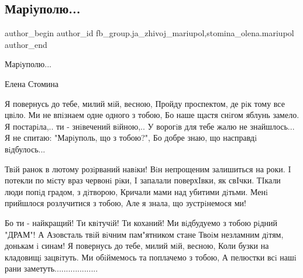  
 
 
 
 

\subsection{Марiуполю...}
\label{sec:26_02_2023.fb.fb_group.ja_zhivoj_mariupol.1.mariupolyu_}
 
\ifcmt
 author_begin
   author_id fb_group.ja_zhivoj_mariupol,stomina_olena.mariupol
 author_end
\fi

Марiуполю...

Елена Стомина

\obeycr
Я повернусь до тебе, милий мiй, весною,
Пройду проспектом, де рiк тому все цвiло.
Ми не впiзнаем одне одного з тобою,
Бо наше щастя снiгом яблунь замело.
Я постарiла,.. ти - знiвечений вiйною,..
У ворогiв для тебе жалю не знайшлось...
Я не спитаю: "Марiуполь, що з тобою?",
Бо добре знаю, що насправдi вiдбулось...
\restorecr

\obeycr
Твiй ранок в лютому розiрваний навiки!
Вiн непрощеним залишиться на роки.
I потекли по мiсту враз червонi рiки,
I запалали поверхIвки, як свIчки.
ТIкали люди попiд градом, з дiтворою,
Кричали мами над убитими дiтьми.
Менi прийшлося розлучитися з тобою,
Але я знала, що зустрiнемося ми!
\restorecr

\obeycr
Бо ти - найкращий! Ти квiтучiй! Ти коханий!
Ми вiдбудуемо з тобою рiдний "ДРАМ"!
А Азовсталь твiй вiчним пам"ятником стане
Твоiм незламним дiтям, донькам i синам!
Я повернусь до тебе, милий мiй, весною,
Коли бузки на кладовищi зацвiтуть.
Ми обiймемось та поплачемо з тобою,
А пелюстки всi нашi рани заметуть...................
\restorecr

